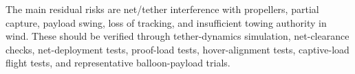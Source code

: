 The main residual risks are net/tether interference with propellers, partial capture, payload swing, loss of tracking, and insufficient towing authority in wind. These should be verified through tether-dynamics simulation, net-clearance checks, net-deployment tests, proof-load tests, hover-alignment tests, captive-load flight tests, and representative balloon-payload trials.
